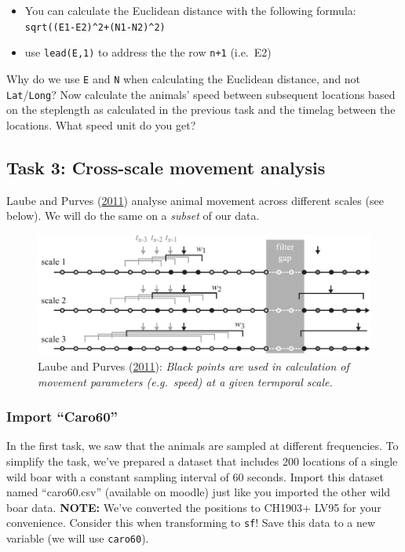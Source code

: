 \documentclass[]{book}
\providecommand{\tightlist}{%
  \setlength{\itemsep}{0pt}\setlength{\parskip}{0pt}}
\begin{document}
\begin{itemize}
\tightlist
\item
  You can calculate the Euclidean distance with the following formula:
  \texttt{sqrt((E1-E2)\^{}2+(N1-N2)\^{}2)}
\item
  use \texttt{lead(E,1)} to address the the row \texttt{n+1} (i.e.~E2)
\end{itemize}

Why do we use \texttt{E} and \texttt{N} when calculating the Euclidean
distance, and not \texttt{Lat}/\texttt{Long}? Now calculate the animals'
speed between subsequent locations based on the steplength as calculated
in the previous task and the timelag between the locations. What speed
unit do you get?

\subsection{Task 3: Cross-scale movement
analysis}\label{task-3-cross-scale-movement-analysis}

Laube and Purves (\protect\hyperlink{ref-laube2011}{2011}) analyse
animal movement across different scales (see below). We will do the same
on a \emph{subset} of our data.

\begin{figure}
\centering
\includegraphics{02_Images/laube_2011_2.jpg}
\caption{Laube and Purves (\protect\hyperlink{ref-laube2011}{2011}):
\emph{Black points are used in calculation of movement parameters
(e.g.~speed) at a given termporal scale.}}
\end{figure}

\subsubsection{\texorpdfstring{Import
``Caro60''}{Import Caro60}}\label{import-caro60}

In the first task, we saw that the animals are sampled at different
frequencies. To simplify the task, we've prepared a dataset that
includes 200 locations of a single wild boar with a constant sampling
interval of 60 seconds. Import this dataset named ``caro60.csv''
(available on moodle) just like you imported the other wild boar data.
\textbf{NOTE:} We've converted the positions to CH1903+ LV95 for your
convenience. Consider this when transforming to \texttt{sf}! Save this
data to a new variable (we will use \texttt{caro60}).
\end{document}
